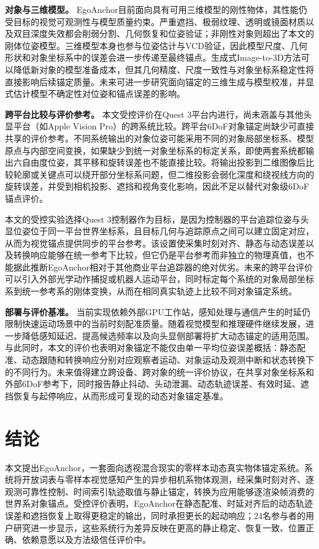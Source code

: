\documentclass[review]{vgtc}
\begin{document}
\textbf{对象与三维模型。}
EgoAnchor目前面向具有可用三维模型的刚性物体，其性能仍受目标的视觉可观测性与模型质量约束。严重遮挡、极弱纹理、透明或镜面材质以及双目深度失效都会削弱分割、几何恢复和位姿验证；非刚性对象则超出了本文的刚体位姿模型。三维模型本身也参与位姿估计与VCD验证，因此模型尺度、几何形状和对象坐标系中的误差会进一步传递至最终锚点。生成式Image-to-3D方法可以降低新对象的模型准备成本，但其几何精度、尺度一致性与对象坐标系稳定性将直接影响后续锚定质量。未来可进一步研究面向锚定的三维生成与模型校准，并显式估计模型不确定性对位姿和锚点误差的影响。

\textbf{跨平台比较与评价参考。}
本文受控评价在Quest 3平台内进行，尚未涵盖与其他头显平台（如Apple Vision Pro）的跨系统比较。跨平台6DoF对象锚定尚缺少可直接共享的评价参考。不同系统输出的对象位姿可能采用不同的对象局部坐标系、模型原点与内部空间变换，如果缺少到统一对象坐标系的标定关系，即使两套系统都输出六自由度位姿，其平移和旋转误差也不能直接比较。将输出投影到二维图像后比较轮廓或关键点可以绕开部分坐标系问题，但二维投影会弱化深度和绕视线方向的旋转误差，并受到相机投影、遮挡和视角变化影响，因此不足以替代对象级6DoF锚点评价。

本文的受控实验选择Quest 3控制器作为目标，是因为控制器的平台追踪位姿与头显位姿位于同一平台世界坐标系，且目标几何与追踪原点之间可以建立固定对应，从而为视觉锚点提供同步的平台参考。该设置使采集时刻对齐、静态与动态误差以及转换响应能够在统一参考下比较，但它仍是平台参考而非独立的物理真值，也不能据此推断EgoAnchor相对于其他商业平台追踪器的绝对优劣。未来的跨平台评价可以引入外部光学动作捕捉或机器人运动平台，同时标定每个系统的对象局部坐标系到统一参考系的刚体变换，从而在相同真实轨迹上比较不同对象锚定系统。

\textbf{部署与评价基准。}
当前实现依赖外部GPU工作站，感知处理与通信产生的时延仍限制快速运动场景中的当前时刻配准质量。随着视觉模型和推理硬件继续发展，进一步降低感知延迟、提高候选频率以及向头显侧部署将扩大动态锚定的适用范围。与此同时，本文的评价也表明对象锚定不能仅由单一平均位姿误差概括：静态配准、动态跟随和转换响应分别对应观察者运动、对象运动及观测中断和状态转换下的不同行为。未来值得建立跨设备、跨对象的统一评价协议，在共享对象坐标系和外部6DoF参考下，同时报告静止抖动、头动泄漏、动态轨迹误差、有效时延、遮挡恢复与起停响应，从而形成可复现的动态对象锚定基准。

\section{结论}\label{sec:conclusion}

本文提出EgoAnchor，一套面向透视混合现实的零样本动态真实物体锚定系统。系统将开放词表与零样本视觉感知产生的异步相机系物体观测，经采集时刻对齐、逐观测可靠性控制、时间索引轨迹取值与静止锚定，转换为应用能够逐渲染帧消费的世界系对象锚点。受控评价表明，EgoAnchor在静态配准、时延对齐后的动态轨迹误差和遮挡恢复上取得更稳定的输出，同时承担更长的起动响应；24名参与者的用户研究进一步显示，这些系统行为差异反映在更高的静止稳定、恢复一致、位置正确、依赖意愿以及方法级信任评价中。
\end{document}
